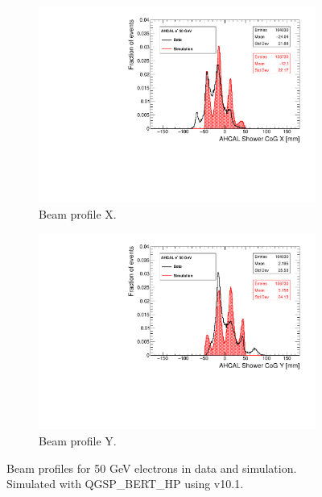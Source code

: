 \begin{figure}[htbp!]
  \centering
  \begin{subfigure}[t]{0.49\textwidth}
    \includegraphics[width=1.\linewidth]{../Thesis_Plots/Timing/Electrons/Plots/Run24405_CoGX_AHCAL_50GeV_Comparison.pdf}
    \caption{Beam profile X.} \label{fig:e50GeVX}
  \end{subfigure}
  \hfill
  \begin{subfigure}[t]{0.49\textwidth}
    \includegraphics[width=1.\linewidth]{../Thesis_Plots/Timing/Electrons/Plots/Run24405_CoGY_AHCAL_50GeV_Comparison.pdf}
    \caption{Beam profile Y.} \label{fig:e50GeVY}
  \end{subfigure}
  \caption{Beam profiles for 50 GeV electrons in data and simulation. Simulated with QGSP\_BERT\_HP using \geant v10.1.}
\end{figure}

